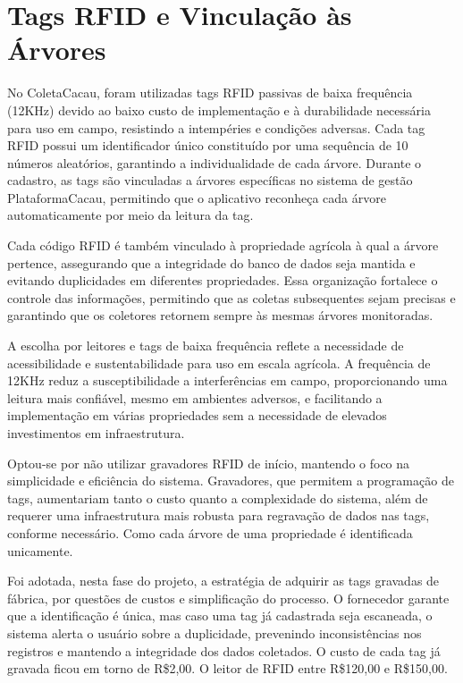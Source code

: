 \section{Tags RFID e Vinculação às Árvores}
No ColetaCacau, foram utilizadas tags RFID passivas de baixa frequência (12KHz) devido ao baixo custo de implementação e à durabilidade necessária para uso em campo, resistindo a intempéries e condições adversas. Cada tag RFID possui um identificador único constituído por uma sequência de 10 números aleatórios, garantindo a individualidade de cada árvore. Durante o cadastro, as tags são vinculadas a árvores específicas no sistema de gestão PlataformaCacau, permitindo que o aplicativo reconheça cada árvore automaticamente por meio da leitura da tag.

Cada código RFID é também vinculado à propriedade agrícola à qual a árvore pertence, assegurando que a integridade do banco de dados seja mantida e evitando duplicidades em diferentes propriedades. Essa organização fortalece o controle das informações, permitindo que as coletas subsequentes sejam precisas e garantindo que os coletores retornem sempre às mesmas árvores monitoradas.

A escolha por leitores e tags de baixa frequência reflete a necessidade de acessibilidade e sustentabilidade para uso em escala agrícola. A frequência de 12KHz reduz a susceptibilidade a interferências em campo, proporcionando uma leitura mais confiável, mesmo em ambientes adversos, e facilitando a implementação em várias propriedades sem a necessidade de elevados investimentos em infraestrutura.

Optou-se por não utilizar gravadores RFID de início, mantendo o foco na simplicidade e eficiência do sistema. Gravadores, que permitem a programação de tags, aumentariam tanto o custo quanto a complexidade do sistema, além de requerer uma infraestrutura mais robusta para regravação de dados nas tags, conforme necessário. Como cada árvore de uma propriedade é identificada unicamente.

Foi adotada, nesta fase do projeto, a estratégia de adquirir as tags gravadas de fábrica, por questões de custos e simplificação do processo. O fornecedor garante que a identificação é única, mas caso uma tag já cadastrada seja escaneada, o sistema alerta o usuário sobre a duplicidade, prevenindo inconsistências nos registros e mantendo a integridade dos dados coletados. O custo de cada tag já gravada ficou em torno de R\$2,00. O leitor de RFID entre R\$120,00 e R\$150,00.

